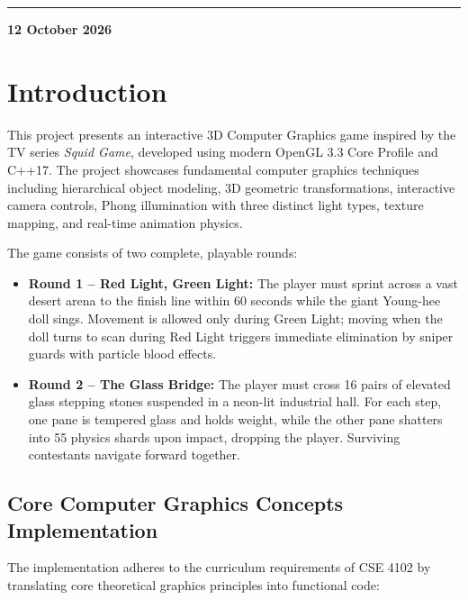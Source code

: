 \documentclass[11pt,a4paper]{article}
\begin{document}
\begin{titlepage}
\vspace{1.0cm}
{\color{sgteal}\rule{0.85\linewidth}{0.8pt}}\par
\vspace{0.3cm}
{\large\bfseries 12 October 2026\par}
\vspace*{0.2cm}
\end{titlepage}

{\small\tableofcontents}
\clearpage

\section{Introduction}
This project presents an interactive 3D Computer Graphics game inspired by the TV series \emph{Squid Game},
developed using modern OpenGL 3.3 Core Profile and C++17. The project showcases fundamental computer graphics
techniques including hierarchical object modeling, 3D geometric transformations, interactive camera controls,
Phong illumination with three distinct light types, texture mapping, and real-time animation physics.

The game consists of two complete, playable rounds:
\begin{itemize}
  \item \textbf{Round 1 -- Red Light, Green Light:} The player must sprint across a vast desert arena to the finish line
        within 60 seconds while the giant Young-hee doll sings. Movement is allowed only during Green Light; moving when
        the doll turns to scan during Red Light triggers immediate elimination by sniper guards with particle blood effects.
  \item \textbf{Round 2 -- The Glass Bridge:} The player must cross 16 pairs of elevated glass stepping stones suspended
        in a neon-lit industrial hall. For each step, one pane is tempered glass and holds weight, while the other pane
        shatters into 55 physics shards upon impact, dropping the player. Surviving contestants navigate forward together.
\end{itemize}

\subsection{Core Computer Graphics Concepts Implementation}
The implementation adheres to the curriculum requirements of CSE 4102 by translating core theoretical graphics principles into functional code:
\end{document}
